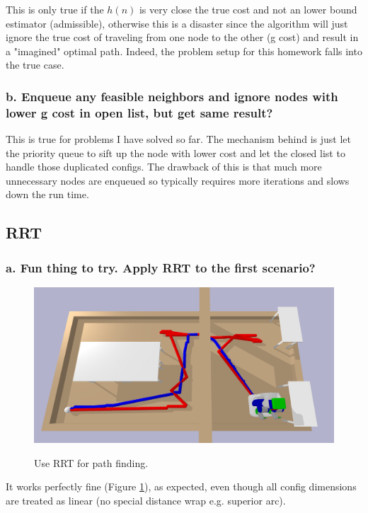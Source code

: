 \documentclass{article}
\theoremstyle{definition} %
\begin{document}
This is only true if the $h(n)$ is very close the true cost and not an lower bound estimator (admissible), otherwise this is a disaster since the algorithm will just ignore the true cost of traveling from one node to the other (g cost) and result in a "imagined" optimal path. Indeed, the problem setup for this homework falls into the true case.

\subsubsection*{b. Enqueue any feasible neighbors and ignore nodes with lower g cost in open list, but get same result?}

This is true for problems I have solved so far. The mechanism behind is just let the priority queue to sift up the node with lower cost and let the closed list to handle those duplicated configs. The drawback of this is that much more unnecessary nodes are enqueued so typically requires more iterations and slows down the run time.


\subsection*{RRT}
\subsubsection*{a. Fun thing to try. Apply RRT to the first scenario?}

\begin{figure}[h]
    \centering
        \textsf{\includegraphics[width=0.8\columnwidth]{rrt_path.png}}
        \caption{Use RRT for path finding.}
        \label{fig:rrt_path}
\end{figure}

It works perfectly fine (Figure \ref{fig:rrt_path}), as expected, even though all config dimensions are treated as linear (no special distance wrap e.g. superior arc).
\end{document}
